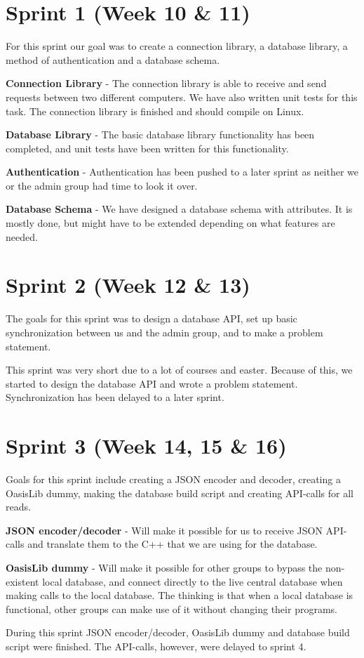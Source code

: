 \section{Sprint 1 (Week 10 \& 11)}
For this sprint our goal was to create a connection library, a database library, a method of authentication and a database schema.

\textbf{Connection Library} - The connection library is able to receive and send requests between two different computers. We have also written unit tests for this task. The connection library is finished and should compile on Linux.

\textbf{Database Library} - The basic database library functionality has been completed, and unit tests have been written for this functionality.

\textbf{Authentication} - Authentication has been pushed to a later sprint as neither we or the admin group had time to look it over.

\textbf{Database Schema} - We have designed a database schema with attributes. It is mostly done, but might have to be extended depending on what features are needed.

\section{Sprint 2 (Week 12 \& 13)}
The goals for this sprint was to design a database API, set up basic synchronization between us and the admin group, and to make a problem statement.

This sprint was very short due to a lot of courses and easter. Because of this, we started to design the database API and wrote a problem statement. Synchronization has been delayed to a later sprint.

\section{Sprint 3 (Week 14, 15 \& 16)}
Goals for this sprint include creating a JSON encoder and decoder, creating a OasisLib dummy, making the database build script and creating API-calls for all reads.

\textbf{JSON encoder/decoder} - Will make it possible for us to receive JSON API-calls and translate them to the C++ that we are using for the database.

\textbf{OasisLib dummy} - Will make it possible for other groups to bypass the non-existent local database, and connect directly to the live central database when making calls to the local database. The thinking is that when a local database is functional, other groups can make use of it without changing their programs.

During this sprint JSON encoder/decoder, OasisLib dummy and database build script were finished. The API-calls, however, were delayed to sprint 4.